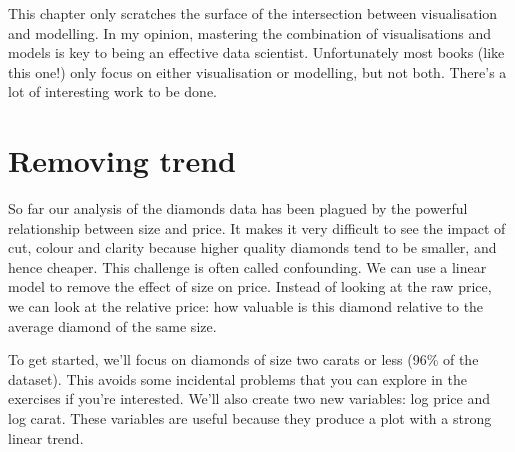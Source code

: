 This chapter only scratches the surface of the intersection between
visualisation and modelling. In my opinion, mastering the combination of
visualisations and models is key to being an effective data scientist.
Unfortunately most books (like this one!) only focus on either
visualisation or modelling, but not both. There's a lot of interesting
work to be done.

\hypertarget{sub:trend}{%
\section{Removing trend}\label{sub:trend}}

So far our analysis of the diamonds data has been plagued by the
powerful relationship between size and price. It makes it very difficult
to see the impact of cut, colour and clarity because higher quality
diamonds tend to be smaller, and hence cheaper. This challenge is often
called confounding. We can use a linear model to remove the effect of
size on price. Instead of looking at the raw price, we can look at the
relative price: how valuable is this diamond relative to the average
diamond of the same size. 

To get started, we'll focus on diamonds of size two carats or less (96\%
of the dataset). This avoids some incidental problems that you can
explore in the exercises if you're interested. We'll also create two new
variables: log price and log carat. These variables are useful because
they produce a plot with a strong linear trend.

